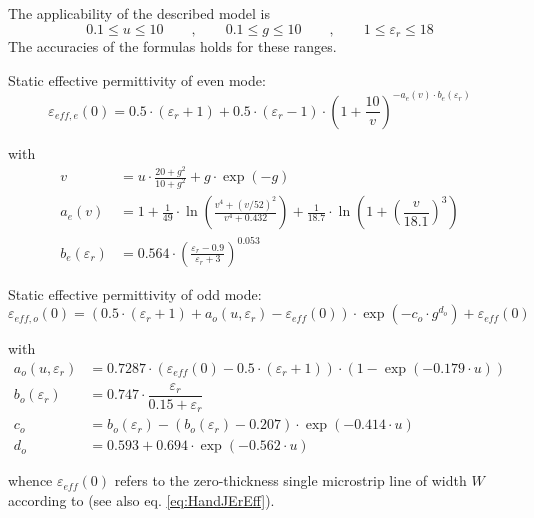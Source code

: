 \documentclass[10pt]{report}
\begin{document}
The applicability of the described model is
\begin{equation}
0.1\le u\le 10 \qquad,\qquad 0.1\le g\le 10 \qquad,\qquad 1\le \varepsilon_r\le 18
\end{equation}
The accuracies of the formulas holds for these ranges.

\addvspace{12pt}

Static effective permittivity of even mode:
\begin{equation}
\varepsilon_{eff,e}(0) = 0.5\cdot (\varepsilon_r+1) + 0.5\cdot (\varepsilon_r-1)\cdot
      \left( 1+\dfrac{10}{v} \right) ^{-a_e\left(v\right)\cdot b_e\left(\varepsilon_r\right)}
\end{equation}

with
\begin{align}
v &= u\cdot\frac{20+g^2}{10+g^2} + g\cdot\exp{\left(-g\right)}\\
a_e\left(v\right) &= 1 + \frac{1}{49}\cdot\ln\left( \frac{v^4 + \left( v/52 \right)^2}{v^4 + 0.432} \right)
    + \frac{1}{18.7}\cdot\ln\left( 1 + \left( \dfrac{v}{18.1} \right)^3 \right)\\
b_e\left(\varepsilon_r\right) &= 0.564\cdot\left( \frac{\varepsilon_r-0.9}{\varepsilon_r+3} \right)^{0.053}
\end{align}

Static effective permittivity of odd mode:
\begin{equation}
\varepsilon_{eff,o}(0) = \left(0.5\cdot \left(\varepsilon_r+1\right) + a_o\left(u,\varepsilon_r\right) - \varepsilon_{eff}(0) \right) \cdot
      \exp{\left(-c_o\cdot g^{d_o}\right)} + \varepsilon_{eff}(0)
\end{equation}

with
\begin{align}
a_o\left(u,\varepsilon_r\right) &= 0.7287\cdot\left( \varepsilon_{eff}(0) - 0.5\cdot \left( \varepsilon_r + 1\right) \right) \cdot
      \left(1-\exp{\left(-0.179\cdot u\right)}\right)\\
b_o\left(\varepsilon_r\right) &= 0.747\cdot\dfrac{\varepsilon_r}{0.15+\varepsilon_r}\\
c_o &= b_o(\varepsilon_r) - \left(b_o\left(\varepsilon_r\right)-0.207\right)\cdot\exp{\left(-0.414\cdot u\right)}\\
d_o &= 0.593+0.694\cdot\exp{\left(-0.562\cdot u\right)}
\end{align}

whence $\varepsilon_{eff}(0)$ refers to the zero-thickness single
microstrip line of width $W$ according to \cite{Hammerstad} (see also
eq. \eqref{eq:HandJErEff}).
\end{document}
